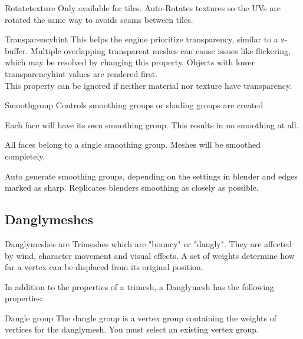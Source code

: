 \begin{property}{Rotatetexture}
Only available for tiles. Auto-Rotates textures so the UVs are rotated
the same way to avoids seams between tiles.
\end{property}

\begin{property}{Transparencyhint}
This helps the engine prioritize transparency, similar to a z-buffer.
Multiple overlapping transparent meshes can cause issues like
flickering, which may be resolved by changing this property. Objects 
with lower transparencyhint values are rendered first.\\

This property can be ignored if neither material nor texture have transparency.
\end{property}

\begin{property}{Smoothgroup}
Controls smoothing groups or shading groups are created
\begin{description}[leftmargin=6em,style=nextline]
    \item[Separate] Each face will have its own smoothing group. This results in no smoothing at all.
    \item[Single] All faces belong to a single smoothing group. Meshes will be smoothed completely.
    \item[Auto] Auto generate smoothing groups, depending on the settings in blender and edges marked as sharp. Replicates blenders smoothing as closely as possible.
\end{description}
\end{property}

\subsection{Danglymeshes}
Danglymeshes are Trimeshes which are "bouncy" or "dangly". They are affected by
wind, character movement and visual effects. A set of weights determine how far a 
vertex can be displaced from its original position.

In addition to the properties of a trimesh, a Danglymesh has the following 
properties:

\begin{property}{Dangle group} 
The dangle group is a vertex group containing the weights of vertices for the danglymesh. You must select an existing vertex group.
\end{property}

